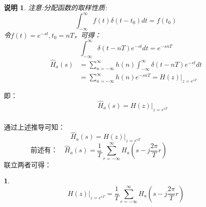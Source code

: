 \documentclass[notheorems,compress,mathserif,table]{beamer}
\newtheorem{dablock}{}
\newtheorem{explain}{说明}
\begin{document}
\begin{frame}[shrink]\frametitle{}%
\begin{explain}
 注意:分配函数的取样性质:
 $$\int_{-\infty}^{\infty}f(t)\delta(t-t_0)dt = f(t_0)$$
 令$f(t) = e^{-st},t_0 =nT $，可得：
 $$\int_{-\infty}^{\infty}\delta(t-nT)e^{-st}dt = e^{-snT}$$
  \begin{equation*}
  \begin{split}
  \hat{H}_a(s) &=\sum_{n=-\infty}^{\infty}h(n)\int_{-\infty}^{\infty}\delta(t-nT)e^{-st}dt\\
               &= \sum_{n=-\infty}^{\infty}h(n)e^{-snT} =H(z)|_{z=e^{sT}}
  \end{split}
  \end{equation*}
 \end{explain}
 $\mbox{即：}$
 $$\quad\quad \hat{H}_a(s)= H(z)|_{z=e^{sT}}$$
\end{frame}
%
%
\begin{frame}[allowframebreaks]\frametitle{}%
%
 \quad 通过上述推导可知：
 $$\mbox{}\quad\quad\quad   \hat{H}_a(s)= H(z)|_{z=e^{sT}}\quad\quad\quad\quad\quad\quad\quad\quad\quad$$
 $$\mbox{前述有：}\quad \hat{H}_a(s) = \frac{1}{T}\sum_{r=-\infty}^{\infty}H_a(s-j\frac{2\pi}{T}r)
 \quad\quad\quad\quad\quad\quad\quad\quad$$
 联立两者可得：
 \begin{dablock}
 $$
 H(z)|_{z=e^{sT}}=  \frac{1}{T}          \sum_{r=-\infty}^{\infty}H_a(s-j\frac{2\pi}{T}r)
 $$
 \end{dablock}
\end{frame}
\end{document}
